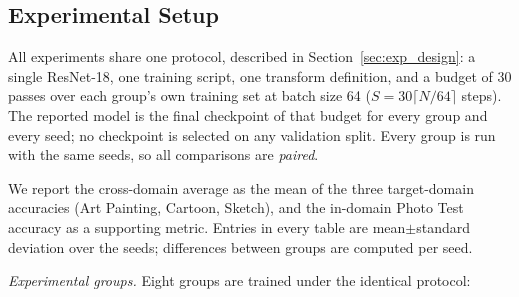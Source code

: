 \subsection{Experimental Setup}
\label{sec:setup}
\label{sec:training_prep}

All experiments share one protocol, described in Section~\ref{sec:exp_design}: a single ResNet-18, one training script, one transform definition, and a budget of 30 passes over each group's own training set at batch size 64 ($S = 30\lceil N/64\rceil$ steps). The reported model is the final checkpoint of that budget for every group and every seed; no checkpoint is selected on any validation split. Every group is run with the same seeds, so all comparisons are \emph{paired}.

We report the cross-domain average as the mean of the three target-domain accuracies (Art Painting, Cartoon, Sketch), and the in-domain Photo Test accuracy as a supporting metric. Entries in every table are mean$\pm$standard deviation over the seeds; differences between groups are computed per seed.

\textit{Experimental groups.} Eight groups are trained under the identical protocol:

